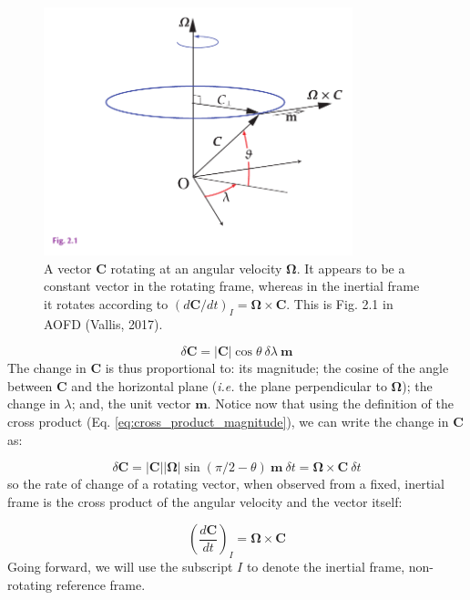 \documentclass[12pt]{article}
\numberwithin{equation}{section}
\numberwithin{figure}{section}
\numberwithin{table}{section}
\begin{document}
\begin{figure}[h]
  \centering
  \includegraphics[width=0.8\textwidth]{assets/fig_rotating_vector.pdf}
  \caption{
    A vector $\mathbf{C}$ rotating at an angular velocity $\mathbf{\Omega}$.
    It appears to be a constant vector in the rotating frame, whereas in the
    inertial frame it rotates according to
    $\left(d\mathbf{C}/dt\right)_I = \mathbf{\Omega} \times \mathbf{C}$.
    This is Fig. 2.1 in AOFD (Vallis, 2017).
  }
  \label{fig:rotating_vector}
\end{figure}

\begin{equation}
  \delta \mathbf{C} = |\mathbf{C}| \cos\theta\ \delta \lambda\ \mathbf{m}
\end{equation}
The change in $\mathbf{C}$ is thus proportional to:
its magnitude;
the cosine of the angle between $\mathbf{C}$ and the horizontal plane
(\textit{i.e.} the plane perpendicular to $\mathbf{\Omega}$);
the change in $\lambda$;
and, the unit vector $\mathbf{m}$.
Notice now that using the definition of the cross product (Eq. \ref{eq:cross_product_magnitude}),
we can write the change in $\mathbf{C}$ as:

\begin{equation}
  \delta \mathbf{C} = |\mathbf{C}| |\mathbf{\Omega}| \sin(\pi/2 - \theta)\ \mathbf{m}\ \delta t =
  \mathbf{\Omega} \times \mathbf{C}\ \delta t
\end{equation}
so the rate of change of a rotating vector, when observed from a fixed, inertial
frame is the cross product of the angular velocity and the vector itself:

\begin{equation}
  \left(\frac{d\mathbf{C}}{dt}\right)_I = \mathbf{\Omega} \times \mathbf{C}
\end{equation}
Going forward, we will use the subscript $I$ to denote the inertial frame,
non-rotating reference frame.
\end{document}
